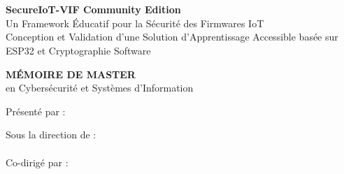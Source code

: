 
\begin{titlepage}
\begin{center}

\vspace*{1cm}
{\large \universite}\\
{\large \faculte}\\
{\large \departement}

\vspace{2cm}

{\huge \textbf{SecureIoT-VIF Community Edition}}\\
\vspace{0.5cm}
{\Large Un Framework Éducatif pour la Sécurité des Firmwares IoT}\\
\vspace{0.5cm}
{\large Conception et Validation d'une Solution d'Apprentissage Accessible basée sur ESP32 et Cryptographie Software}

\vspace{2cm}

{\large \textbf{MÉMOIRE DE MASTER}}\\
\vspace{0.3cm}
{\large en Cybersécurité et Systèmes d'Information}

\vspace{2cm}

{\large Présenté par :}\\
\vspace{0.3cm}
{\Large \textbf{\auteur}}

\vspace{1.5cm}

{\large Sous la direction de :}\\
\vspace{0.2cm}
{\large \directeur}\\
\vspace{0.2cm}
{\large Co-dirigé par :}\\
\vspace{0.2cm}
{\large \codirecteur}

\vfill

{\large \annee}

\end{center}
\end{titlepage}